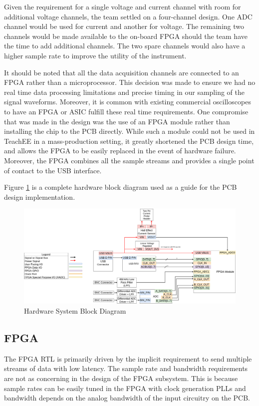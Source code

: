 \documentclass[letterpaper,11pt]{article}
\begin{document}
Given the requirement for a single voltage and current channel with room for
additional voltage channels, the team settled on a four-channel design. One ADC
channel would be used for current and another for voltage. The remaining two
channels would be made available to the on-board FPGA should the team have the
time to add additional channels. The two spare channels would also have a higher
sample rate to improve the utility of the instrument.

It should be noted that all the data acquisition channels are connected to an
FPGA rather than a microprocessor. This decision was made to ensure we had no
real time data processing limitations and precise timing in our sampling of the
signal waveforms. Moreover, it is common with existing commercial oscilloscopes
to have an FPGA or ASIC fulfill these real time requirements. One compromise
that was made in the design was the use of an FPGA module rather than installing
the chip to the PCB directly. While such a module could not be used in TeachEE
in a mass-production setting, it greatly shortened the PCB design time, and
allows the FPGA to be easily replaced in the event of hardware failure.
Moreover, the FPGA combines all the sample streams and provides a single point
of contact to the USB interface.

Figure \ref{fig:hw-block-diagram} is a complete hardware block diagram used as a
guide for the PCB design implementation.

\begin{figure}[h]
  \centering
  \includegraphics[width=\textwidth]{../../misc/TeachEE-System-Diagram-Hardware.png}
  \caption{Hardware System Block Diagram}
  \label{fig:hw-block-diagram}
\end{figure}

\subsection{FPGA} %
The FPGA RTL is primarily driven by the implicit requirement to send multiple
streams of data with low latency. The sample rate and bandwidth requirements are
not as concerning in the design of the FPGA subsystem. This is because sample
rates can be easily tuned in the FPGA with clock generation PLLs and bandwidth
depends on the analog bandwidth of the input circuitry on the PCB.
\end{document}
